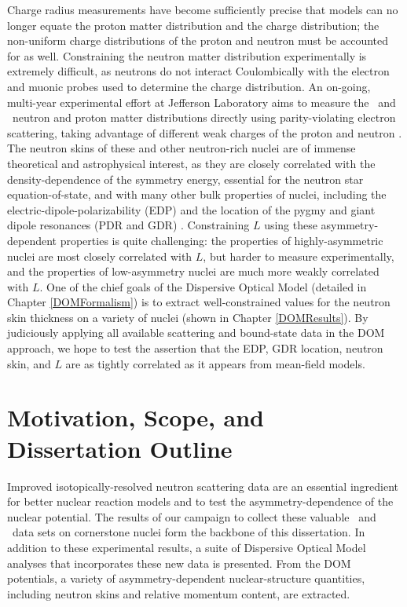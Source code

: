 Charge radius measurements have
become sufficiently precise that models can no longer equate the proton matter
distribution and the charge distribution; the non-uniform charge distributions of the
proton and neutron must be accounted for as well. Constraining the neutron matter
distribution experimentally is extremely difficult, as neutrons do not interact
Coulombically with the electron and muonic probes used to determine the charge
distribution. An on-going, multi-year
experimental effort at Jefferson Laboratory aims to measure the \caEight\ and
\pbEight\ neutron and proton matter distributions directly using parity-violating electron
scattering, taking advantage of different weak charges of the proton and neutron
\cite{Horowitz2014}. The neutron skins of these and other neutron-rich nuclei
are of immense theoretical and astrophysical interest, as they are closely
correlated with the density-dependence of the symmetry energy, essential
for the neutron star equation-of-state, and with many other bulk properties of
nuclei, including the electric-dipole-polarizability (EDP) and the location of the
pygmy and giant dipole resonances (PDR and GDR)
\cite{Vinas2014, Brown2000, Fattoyev2012, Piekarewicz2012, Zhang2018}.
Constraining $L$ using these asymmetry-dependent 
properties is quite challenging: the properties of highly-asymmetric nuclei are
most closely correlated with $L$, but harder to measure experimentally, and the
properties of low-asymmetry nuclei are much more weakly correlated with $L$.
One of the chief goals of the Dispersive Optical
Model (detailed in Chapter \ref{DOMFormalism}) is to extract well-constrained values for the 
neutron skin thickness on a variety of nuclei (shown in Chapter
\ref{DOMResults}). By judiciously applying all available scattering and bound-state
data in the DOM approach, we hope to test the assertion
that the EDP, GDR location, neutron skin, and $L$ are as tightly correlated as
it appears from mean-field models.

\section{Motivation, Scope, and Dissertation Outline}
Improved isotopically-resolved neutron scattering data are an essential ingredient
for better nuclear reaction models and to test the asymmetry-dependence of the
nuclear potential. The results of our campaign to collect these valuable
\tot\ and \el\ data sets on cornerstone nuclei form the backbone of this dissertation.
In addition to these experimental results, a suite of Dispersive Optical Model analyses that 
incorporates these new data is presented. From the DOM potentials, a variety of asymmetry-dependent 
nuclear-structure quantities, including neutron skins and relative momentum
content, are extracted.

